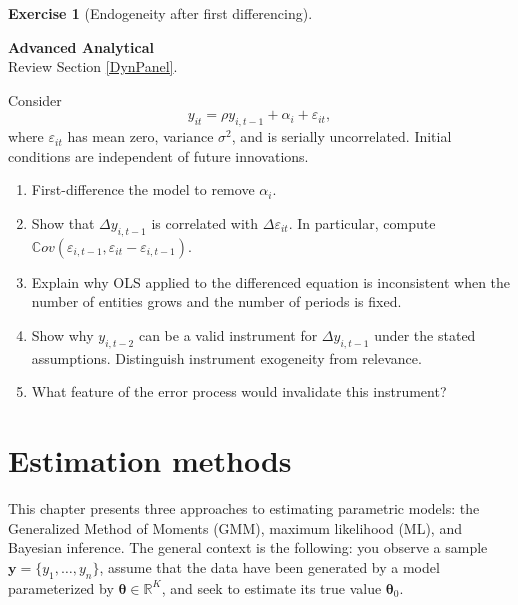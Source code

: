 \documentclass[
  11pt,
]{book}
\providecommand{\tightlist}{%
  \setlength{\itemsep}{0pt}\setlength{\parskip}{0pt}}
\theoremstyle{definition}
\theoremstyle{definition}
\theoremstyle{definition}
\newtheorem{exercise}{Exercise}[chapter]
\theoremstyle{definition}
\theoremstyle{remark}
\begin{document}
\begin{exercisebox}

\begin{exercise}[Endogeneity after first differencing]
\protect\hypertarget{exr:panel-dynamic-panel}{}\label{exr:panel-dynamic-panel}

\textbf{Advanced \textbar{} Analytical}\\
Review Section \ref{DynPanel}.

Consider
\[
y_{it}=\rho y_{i,t-1}+\alpha_i+\varepsilon_{it},
\]
where \(\varepsilon_{it}\) has mean zero, variance \(\sigma^2\), and is serially uncorrelated. Initial conditions are independent of future innovations.

\begin{enumerate}
\def\labelenumi{\arabic{enumi}.}
\tightlist
\item
  First-difference the model to remove \(\alpha_i\).
\item
  Show that \(\Delta y_{i,t-1}\) is correlated with \(\Delta\varepsilon_{it}\). In particular, compute \(\mathbb{C}ov(\varepsilon_{i,t-1},\varepsilon_{it}-\varepsilon_{i,t-1})\).
\item
  Explain why OLS applied to the differenced equation is inconsistent when the number of entities grows and the number of periods is fixed.
\item
  Show why \(y_{i,t-2}\) can be a valid instrument for \(\Delta y_{i,t-1}\) under the stated assumptions. Distinguish instrument exogeneity from relevance.
\item
  What feature of the error process would invalidate this instrument?
\end{enumerate}

\end{exercise}

\end{exercisebox}

\chapter{Estimation methods}\label{estimation-methods}

This chapter presents three approaches to estimating parametric models: the Generalized Method of Moments (GMM), maximum likelihood (ML), and Bayesian inference. The general context is the following: you observe a sample \(\mathbf{y}=\{y_1,\dots,y_n\}\), assume that the data have been generated by a model parameterized by \({\boldsymbol\theta} \in \mathbb{R}^K\), and seek to estimate its true value \({\boldsymbol\theta}_0\).
\end{document}
